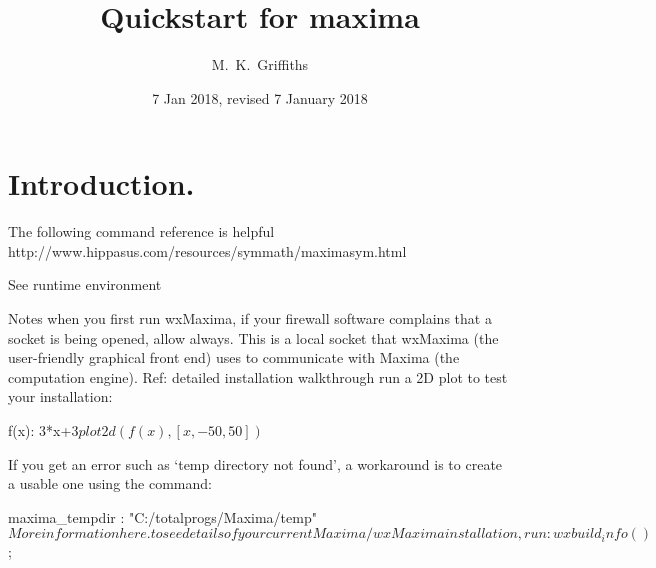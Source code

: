 \documentclass[11pt]{article}
\begin{document}
\title{Quickstart for maxima}
\author{M.~K.~Griffiths}
\date{7 Jan 2018, revised 7 January 2018}
\maketitle
\insert{}
\section{Introduction.}\label{S1}



The following command reference is helpful
http://www.hippasus.com/resources/symmath/maximasym.html


See runtime environment


Notes
when you first run wxMaxima, if your firewall software complains that a socket is being opened, allow always. This is a local socket that wxMaxima (the user-friendly graphical front end) uses to communicate with Maxima (the computation engine). Ref: detailed installation walkthrough
run a 2D plot to test your installation:

f(x): 3*x+3$
plot2d(f(x), [x,-50,50])$

If you get an error such as ‘temp directory not found’, a workaround is to create a usable one using the command:

maxima_tempdir : "C:/totalprogs/Maxima/temp"$

More information here.
to see details of your current Maxima/wxMaxima installation, run:

wxbuild_info()$;
\end{document}

